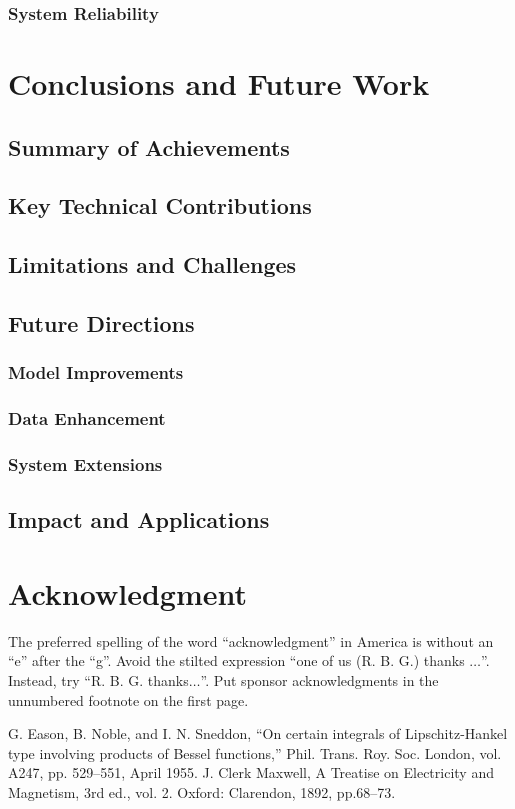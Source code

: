 \documentclass[conference]{IEEEtran}
\begin{document}
\subsubsection{System Reliability}

\section{Conclusions and Future Work}

\subsection{Summary of Achievements}

\subsection{Key Technical Contributions}

\subsection{Limitations and Challenges}

\subsection{Future Directions}

\subsubsection{Model Improvements}

\subsubsection{Data Enhancement}

\subsubsection{System Extensions}

\subsection{Impact and Applications}

\section*{Acknowledgment}

The preferred spelling of the word ``acknowledgment'' in America is without 
an ``e'' after the ``g''. Avoid the stilted expression ``one of us (R. B. 
G.) thanks $\ldots$''. Instead, try ``R. B. G. thanks$\ldots$''. Put sponsor 
acknowledgments in the unnumbered footnote on the first page.

\begin{thebibliography}{00}
 G. Eason, B. Noble, and I. N. Sneddon, ``On certain integrals of Lipschitz-Hankel type involving products of Bessel functions,'' Phil. Trans. Roy. Soc. London, vol. A247, pp. 529--551, April 1955.
 J. Clerk Maxwell, A Treatise on Electricity and Magnetism, 3rd ed., vol. 2. Oxford: Clarendon, 1892, pp.68--73.
\end{thebibliography}
\end{document}

